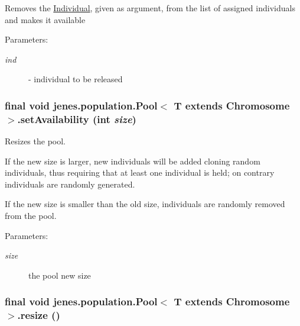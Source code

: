Removes the \hyperlink{}{Individual}, given as argument, from the list of assigned individuals and makes it available

\begin{Desc}
\item[Parameters:]
\begin{description}
\item[{\em ind}]- individual to be released \end{description}
\end{Desc}
\hypertarget{classjenes_1_1population_1_1_pool_3_01_t_01extends_01_chromosome_01_4_625297bb7b48e3b6ab11c081874580bf}{
\subsubsection[setAvailability]{\setlength{\rightskip}{0pt plus 5cm}final void jenes.population.Pool$<$ T extends Chromosome $>$.setAvailability (int {\em size})}}
\label{classjenes_1_1population_1_1_pool_3_01_t_01extends_01_chromosome_01_4_625297bb7b48e3b6ab11c081874580bf}


Resizes the pool.

If the new size is larger, new individuals will be added cloning random individuals, thus requiring that at least one individual is held; on contrary individuals are randomly generated. 

If the new size is smaller than the old size, individuals are randomly removed from the pool. 

\begin{Desc}
\item[Parameters:]
\begin{description}
\item[{\em size}]the pool new size \end{description}
\end{Desc}
\hypertarget{classjenes_1_1population_1_1_pool_3_01_t_01extends_01_chromosome_01_4_c9cfd19d4ef83db5f3b1e805458714c2}{
\subsubsection[resize]{\setlength{\rightskip}{0pt plus 5cm}final void jenes.population.Pool$<$ T extends Chromosome $>$.resize ()}}
\label{classjenes_1_1population_1_1_pool_3_01_t_01extends_01_chromosome_01_4_c9cfd19d4ef83db5f3b1e805458714c2}


